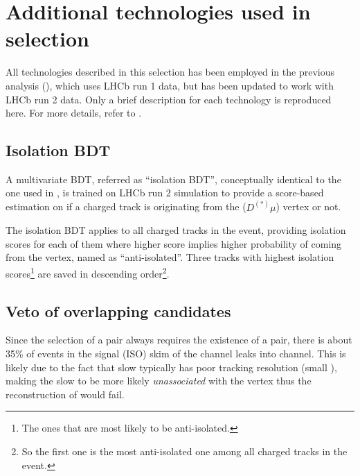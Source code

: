 \section{Additional technologies used in selection}
\label{ref:sel:tech}

All technologies described in this selection has been employed in the previous
analysis (\cite{LHCb-ANA-2020-056}), which uses LHCb run 1 data, but has been
updated to work with LHCb run 2 data.
Only a brief description for each technology is reproduced here.
For more details, refer to \cite{LHCb-ANA-2014-052,LHCb-ANA-2020-056}.

\subsection{Isolation BDT}
\label{ref:sel:tech:iso-bdt}

A multivariate BDT, referred as ``isolation BDT'',
conceptually identical to the one used in \cite{LHCb-ANA-2020-056},
is trained on LHCb run 2 simulation
to provide a score-based estimation on if a charged track is originating from
the \B ($D^{(*)}\mu$) vertex or not.

The isolation BDT applies to all charged tracks in the event,
providing isolation scores for each of them where
higher score implies higher probability of coming from the vertex, named as
``anti-isolated''.
Three tracks with highest isolation scores\footnote{
    The ones that are most likely to be anti-isolated.
} are saved in descending order\footnote{
    So the first one is the most anti-isolated one among all charged tracks
    in the event.
}.


\subsection{Veto of overlapping candidates}
\label{ref:sel:tech:veto}

Since the selection of a \Dstar\muon pair always requires the existence
of a \Dz\muon pair,
there is about 35\% of events in the signal (ISO) skim of the \Dstar channel
leaks into \Dz channel.
This is likely due to the fact that slow \pion typically has poor tracking
resolution (small \ipChiSq), making the slow \pion to be more likely
\emph{unassociated} with the \Dz\mun vertex thus the reconstruction of \Dstar
would fail.

